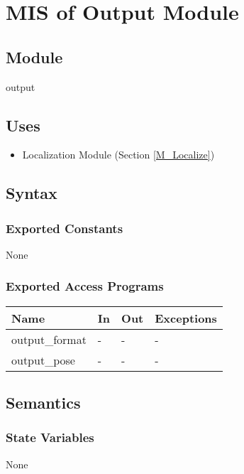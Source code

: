 \documentclass[12pt, titlepage]{article}
\begin{document}
\newpage

\section{MIS of Output Module} \label{M_Output} 
\subsection{Module}

output

\subsection{Uses}
\begin{itemize}
  \item Localization Module (Section \ref{M_Localize})
\end{itemize}

\subsection{Syntax}

\subsubsection{Exported Constants}
None

\subsubsection{Exported Access Programs}

\begin{center}
\begin{tabular}{p{4cm} p{4cm} p{4cm} p{2cm}}
\hline
\textbf{Name} & \textbf{In} & \textbf{Out} & \textbf{Exceptions} \\
\hline
output\_format & - & - & - \\
output\_pose & - & - & - \\
\hline
\end{tabular}
\end{center}

\subsection{Semantics}

\subsubsection{State Variables}
None
\end{document}
